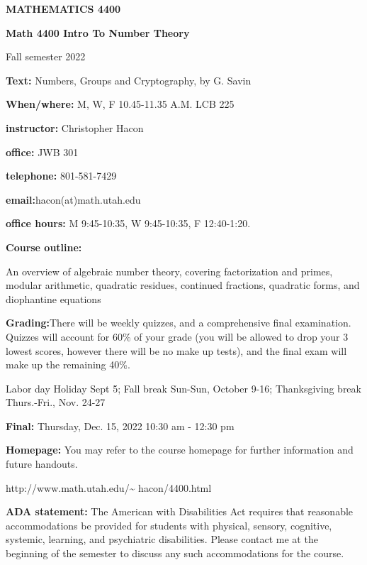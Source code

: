 \documentclass[12pt, a4paper]{amsart}
\begin{document}
\centerline{\bf MATHEMATICS 4400}
\centerline{\bf Math 4400 Intro To Number Theory}
\centerline{Fall semester 2022}
\bigskip

  {\bf Text:}{  Numbers, Groups and Cryptography, by G. Savin}
 
{\bf When/where:}{ M, W, F 10.45-11.35  A.M. LCB 225}
  
{\bf instructor:}{ Christopher Hacon}
  
{\bf  office:} JWB 301

 {\bf telephone:} 801-581-7429
  
{\bf email:}{hacon(at)math.utah.edu}

 {\bf office hours:} M 9:45-10:35, W 9:45-10:35, F 12:40-1:20.

\bigskip
\noindent
{\bf Course outline:}
 	
An overview of algebraic number theory, covering factorization and primes, modular arithmetic, quadratic residues, continued fractions, quadratic forms, and diophantine equations

\noindent
{\bf Grading:}\qquad There will be weekly quizzes, and a comprehensive final 
examination.  Quizzes will account for 60\% of your grade 
(you will be 
allowed to drop your 3 lowest scores, however there will be no make up tests),  
and the final exam will make up the 
remaining 40\%.


Labor day Holiday Sept 5; Fall break Sun-Sun, October 9-16; Thanksgiving break 
Thurs.-Fri., Nov. 24-27

\noindent
{\bf Final:} Thursday, Dec. 15, 2022
10:30 am - 12:30 pm

\medskip\noindent
{\bf Homepage:} You may refer to the course homepage
for further information and future handouts.

\noindent
{ {http://www.math.utah.edu/\~ {} hacon/4400.html}}


\medskip\noindent
{\bf ADA statement:}  The American with Disabilities Act requires 
that reasonable accommodations be provided for students with physical, 
sensory, 
cognitive, systemic, learning, and psychiatric disabilities.  
Please contact me at the beginning of the semester to discuss 
any such accommodations for the course.
\end{document}
